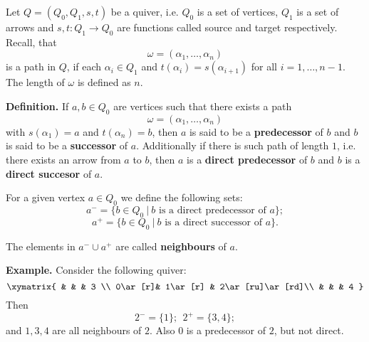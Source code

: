 \documentclass[12pt]{article}
\begin{document}
Let $Q=(Q_0,Q_1,s,t)$ be a quiver, i.e. $Q_0$ is a set of vertices, $Q_1$ is a set of arrows and $s,t:Q_1\to Q_0$ are functions called source and target respectively. Recall, that 
$$\omega=(\alpha_1,\ldots,\alpha_n)$$
is a path in $Q$, if each $\alpha_i\in Q_1$ and $t(\alpha_i)=s(\alpha_{i+1})$ for all $i=1,\ldots,n-1$. The length of $\omega$ is defined as $n$.

\textbf{Definition.} If $a,b\in Q_0$ are vertices such that there exists a path
$$\omega=(\alpha_1,\ldots,\alpha_n)$$
with $s(\alpha_1)=a$ and $t(\alpha_n)=b$, then $a$ is said to be a \textbf{predecessor} of $b$ and $b$ is said to be a \textbf{successor} of $a$. Additionally if there is such path of length $1$, i.e. there exists an arrow from $a$ to $b$, then $a$ is a \textbf{direct predecessor} of $b$ and $b$ is a \textbf{direct succesor} of $a$.

For a given vertex $a\in Q_0$ we define the following sets:
$$a^{-}=\{b\in Q_0\ |\ b\mbox{ is a direct predecessor of }a\};$$
$$a^{+}=\{b\in Q_0\ |\ b\mbox{ is a direct successor of }a\}.$$

The elements in $a^{-}\cup a^{+}$ are called \textbf{neighbours} of $a$.

\textbf{Example.} Consider the following quiver:
$$\xymatrix{
& & & 3 \\
0\ar[r]& 1\ar[r] & 2\ar[ru]\ar[rd]\\
 & & & 4
}$$
Then
$$2^{-}=\{1\};\ \ 2^{+}=\{3,4\};$$
and $1,3,4$ are all neighbours of $2$. Also $0$ is a predecessor of $2$, but not direct.
\end{document}
